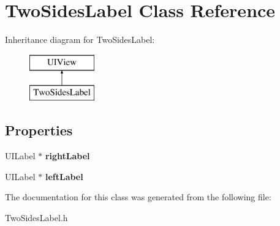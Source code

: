 \hypertarget{interface_two_sides_label}{\section{Two\+Sides\+Label Class Reference}
\label{interface_two_sides_label}
}
Inheritance diagram for Two\+Sides\+Label\+:\begin{figure}[H]
\begin{center}
\leavevmode
\includegraphics[height=2.000000cm]{interface_two_sides_label}
\end{center}
\end{figure}
\subsection*{Properties}
\begin{DoxyCompactItemize}
\item 
\hypertarget{interface_two_sides_label_a91d247769e9ab61c90583be8048c30e7}{U\+I\+Label $\ast$ {\bfseries right\+Label}}\label{interface_two_sides_label_a91d247769e9ab61c90583be8048c30e7}

\item 
\hypertarget{interface_two_sides_label_ae2c5763f3d4b956e6572efb8af215605}{U\+I\+Label $\ast$ {\bfseries left\+Label}}\label{interface_two_sides_label_ae2c5763f3d4b956e6572efb8af215605}

\end{DoxyCompactItemize}


The documentation for this class was generated from the following file\+:\begin{DoxyCompactItemize}
\item 
Two\+Sides\+Label.\+h\end{DoxyCompactItemize}

